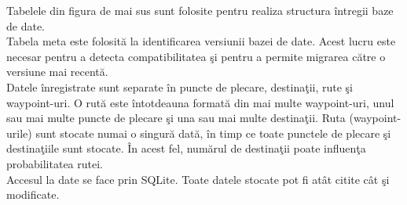 Tabelele din figura de mai sus sunt folosite pentru realiza structura întregii baze de date.
\vspace{6pt}
\\Tabela meta este folosită la identificarea versiunii bazei de date. Acest lucru este necesar pentru a detecta compatibilitatea şi pentru a permite migrarea către o versiune mai recentă. 
\vspace{6pt}
\\Datele înregistrate sunt separate în puncte de plecare, destinaţii, rute şi waypoint-uri. O rută este întotdeauna formată din mai multe waypoint-uri, unul sau mai multe puncte de plecare şi una sau mai multe destinaţii. Ruta (waypoint-urile) sunt stocate numai o singură dată, în timp ce toate punctele de plecare şi destinaţiile sunt stocate. În acest fel, numărul de destinaţii poate influenţa probabilitatea rutei.
\vspace{6pt}
\\Accesul la date se face prin SQLite. Toate datele stocate pot fi atât citite cât şi modificate.


